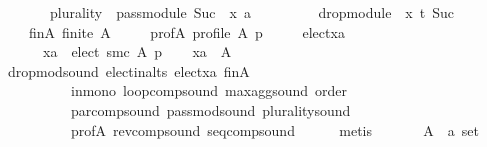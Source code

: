 \begin{isabellebody}
\ \ \ \ \ \ \ {\isacharparenleft}{\kern0pt}{\isacharparenleft}{\kern0pt}plurality{\isasymdown}{\isacharparenright}{\kern0pt}\ {\isasymtriangleright}\ pass{\isacharunderscore}{\kern0pt}module\ {\isacharparenleft}{\kern0pt}Suc\ {}{\isacharparenright}{\kern0pt}\ x{\isacharparenright}{\kern0pt}\ {\isasymparallel}\isactrlsub {\isacharquery}{\kern0pt}a\isanewline
\ \ \ \ \ \ \ \ \ drop{\isacharunderscore}{\kern0pt}module\ {}\ x\ {\isasymcirclearrowleft}\isactrlsub {\isacharquery}{\kern0pt}t\ {\isacharparenleft}{\kern0pt}Suc\ {}{\isacharparenright}{\kern0pt}{\isachardoublequoteclose}\isanewline
\ \ \isamarkupfalse%
\isanewline
\ \ \ \ fin{\isacharunderscore}{\kern0pt}A{\isacharcolon}{\kern0pt}\ {\isachardoublequoteopen}finite\ A{\isachardoublequoteclose}\ \isanewline
\ \ \ \ prof{\isacharunderscore}{\kern0pt}A{\isacharcolon}{\kern0pt}\ {\isachardoublequoteopen}profile\ A\ p{\isachardoublequoteclose}\ \isanewline
\ \ \ \ elect{\isacharunderscore}{\kern0pt}xa{\isacharcolon}{\kern0pt}\isanewline
\ \ \ \ \ \ {\isachardoublequoteopen}xa\ {\isasymin}\ elect\ {\isacharparenleft}{\kern0pt}{\isacharquery}{\kern0pt}smc{\isacharparenright}{\kern0pt}\ A\ p{\isachardoublequoteclose}\isanewline
\ \ \isamarkupfalse%
\ {\isachardoublequoteopen}xa\ {\isasymin}\ A{\isachardoublequoteclose}\isanewline
\ \ \ \ \isamarkupfalse%
\ drop{\isacharunderscore}{\kern0pt}mod{\isacharunderscore}{\kern0pt}sound\ elect{\isacharunderscore}{\kern0pt}in{\isacharunderscore}{\kern0pt}alts\ elect{\isacharunderscore}{\kern0pt}xa\ fin{\isacharunderscore}{\kern0pt}A\isanewline
\ \ \ \ \ \ \ \ \ \ in{\isacharunderscore}{\kern0pt}mono\ loop{\isacharunderscore}{\kern0pt}comp{\isacharunderscore}{\kern0pt}sound\ max{\isacharunderscore}{\kern0pt}agg{\isacharunderscore}{\kern0pt}sound\ order\isanewline
\ \ \ \ \ \ \ \ \ \ par{\isacharunderscore}{\kern0pt}comp{\isacharunderscore}{\kern0pt}sound\ pass{\isacharunderscore}{\kern0pt}mod{\isacharunderscore}{\kern0pt}sound\ plurality{\isacharunderscore}{\kern0pt}sound\isanewline
\ \ \ \ \ \ \ \ \ \ prof{\isacharunderscore}{\kern0pt}A\ rev{\isacharunderscore}{\kern0pt}comp{\isacharunderscore}{\kern0pt}sound\ seq{\isacharunderscore}{\kern0pt}comp{\isacharunderscore}{\kern0pt}sound\isanewline
\ \ \ \ \isamarkupfalse%
\ metis\isanewline
{}\isamarkupfalse%
\isanewline
\ \ \isamarkupfalse%
\isanewline
\ \ \ \ A\ {\isacharcolon}{\kern0pt}{\isacharcolon}{\kern0pt}\ {\isachardoublequoteopen}{\isacharprime}{\kern0pt}a\ set{\isachardoublequoteclose}\ \isanewline

\end{isabellebody}
